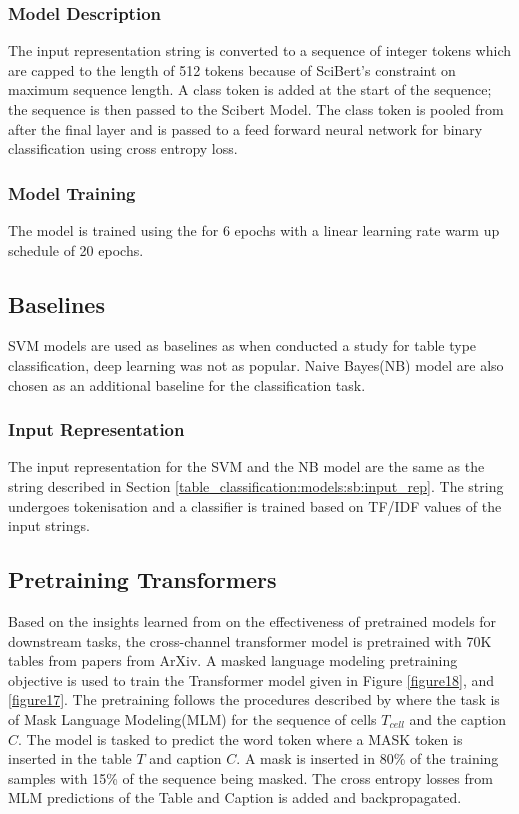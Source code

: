 \subsubsection{Model Description}
The input representation string is converted to a sequence of integer tokens which are capped to the length of 512 tokens because of SciBert's constraint on maximum sequence length. A class token is added at the start of the sequence; the sequence is then passed to the Scibert Model. The class token is pooled from after the final layer and is passed to a feed forward neural network for binary classification using cross entropy loss. 


\subsubsection{Model Training}
The model is trained using the for 6 epochs with a linear learning rate warm up schedule of 20 epochs.

\subsection{Baselines}
SVM models are used as baselines as when \cite{kim2012scientific} conducted a study for table type classification, deep learning was not as popular. Naive Bayes(NB) model are also chosen as an additional baseline for the classification task. 

\subsubsection{Input Representation}
The input representation for the SVM and the NB model are the same as the string described in Section \ref{table_classification:models:sb:input_rep}. The string undergoes tokenisation and a classifier is trained based on TF/IDF values of the input strings. 

\subsection{Pretraining Transformers}
\label{table_classification:models:encoder-model:pre-train}
Based on the insights learned from \cite{hernandez2021scaling} on the effectiveness of pretrained models for downstream tasks, the cross-channel transformer model is pretrained with 70K tables from papers from ArXiv. A masked language modeling pretraining objective is used to train the Transformer model given in Figure \ref{figure18}, and \ref{figure17}. The pretraining follows the procedures described by \cite{deng2020turl} where the task is of Mask Language Modeling(MLM) for the sequence of cells $T_{cell}$ and the caption $C$. The model is tasked to predict the word token where a MASK token is inserted in the table $T$ and caption $C$. A mask is inserted in 80\% of the training samples with 15\% of the sequence being masked. The cross entropy losses from MLM predictions of the Table and Caption is added and backpropagated. 

